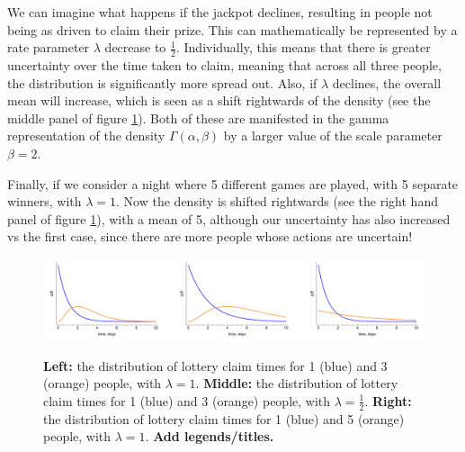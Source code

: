\documentclass[11pt,fullpage]{book}
\begin{document}
We can imagine what happens if the jackpot declines, resulting in people not being as driven to claim their prize. This can mathematically be represented by a rate parameter $\lambda$ decrease to $\frac{1}{2}$. Individually, this means that there is greater uncertainty over the time taken to claim, meaning that across all three people, the distribution is significantly more spread out. Also, if $\lambda$ declines, the overall mean will increase, which is seen as a shift rightwards of the density (see the middle panel of figure \ref{fig:Distributions_gammaLottery}). Both of these are manifested in the gamma representation of the density $\Gamma(\alpha,\beta)$ by a larger value of the scale parameter $\beta=2$.

Finally, if we consider a night where 5 different games are played, with 5 separate winners, with $\lambda=1$. Now the density is shifted rightwards (see the right hand panel of figure \ref{fig:Distributions_gammaLottery}), with a mean of 5, although our uncertainty has also increased vs the first case, since there are more people whose actions are uncertain! 

\begin{figure}
\centering
\scalebox{0.3} 
{\includegraphics{Distributions_gammaLottery.pdf}}
\caption{\textbf{Left:} the distribution of lottery claim times for 1 (blue) and 3 (orange) people, with $\lambda=1$. \textbf{Middle:} the distribution of lottery claim times for 1 (blue) and 3 (orange) people, with $\lambda=\frac{1}{2}$. \textbf{Right:} the distribution of lottery claim times for 1 (blue) and 5 (orange) people, with $\lambda=1$. \textbf{Add legends/titles.}}\label{fig:Distributions_gammaLottery}
\end{figure}
\end{document}
